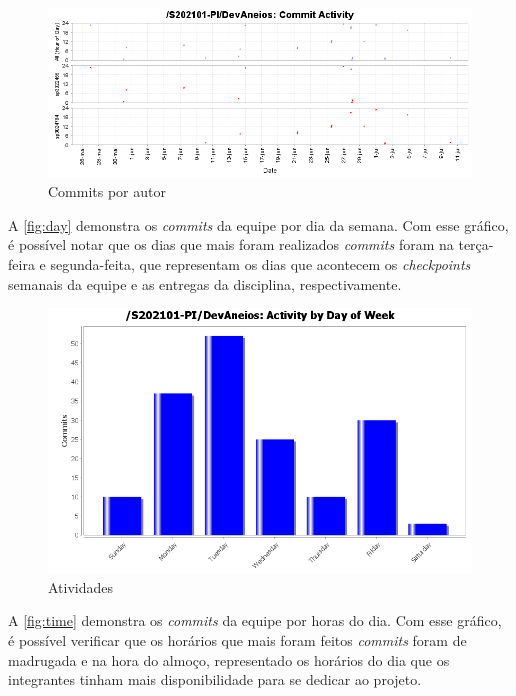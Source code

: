 \documentclass[
    12pt,               %
    openright,          %
    oneside,
    a4paper,            %
    english,            %
    brazil              %
    ]{ifsp-spo-inf-ctds} %
\begin{document}
\begin{figure}[htb]
    \centering
	\includegraphics[width=16cm]{imagens/commitscatterauthors.png}
	\caption{\label{fig:commitsauthors} Commits por autor}
\end{figure}
\FloatBarrier

A \autoref{fig:day} demonstra os \textit{commits} da equipe por dia da semana. Com esse gráfico, é possível notar que os dias que mais foram realizados \textit{commits} foram na terça-feira e segunda-feita, que representam os dias que acontecem os \textit{checkpoints} semanais da equipe e as entregas da disciplina, respectivamente.

\begin{figure}[htb]
    \centering
	\includegraphics[width=16cm]{imagens/activity_day.png}
	\caption{\label{fig:day} Atividades}
\end{figure}
\FloatBarrier

A \autoref{fig:time} demonstra os \textit{commits} da equipe por horas do dia. Com esse gráfico, é possível verificar que os horários que mais foram feitos \textit{commits} foram de madrugada e na hora do almoço, representado os horários do dia que os integrantes tinham mais disponibilidade para se dedicar ao projeto.
\end{document}

